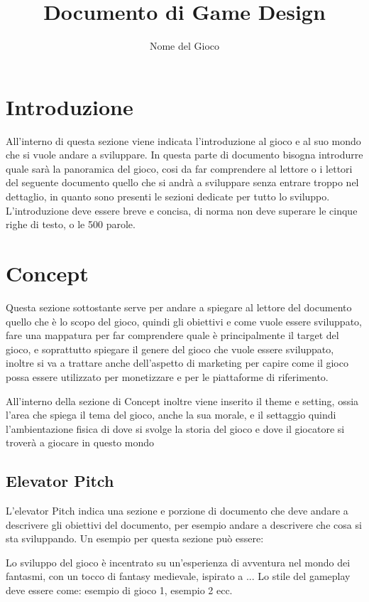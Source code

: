 \documentclass{report}
\title{Documento di Game Design}
\author{Nome del Gioco}
\begin{document}
\maketitle

\tableofcontents
\section{Introduzione}
All'interno di questa sezione viene indicata l'introduzione al gioco e al suo mondo che si vuole andare a sviluppare.
In questa parte di documento bisogna introdurre quale sarà la panoramica del gioco, cosi da far comprendere al lettore o i lettori del seguente documento quello che si andrà a sviluppare senza entrare troppo nel dettaglio, in quanto sono presenti le sezioni dedicate per tutto lo sviluppo.
L'introduzione deve essere breve e concisa, di norma non deve superare le cinque righe di testo, o le 500 parole.

\newpage
\section{Concept}

Questa sezione sottostante serve per andare a spiegare al lettore del documento quello che è lo scopo del gioco, quindi gli obiettivi e come vuole essere sviluppato, fare una mappatura per far comprendere quale è principalmente il target del gioco, e soprattutto spiegare il genere del gioco che vuole essere sviluppato, inoltre si va a trattare anche dell'aspetto di marketing per capire come il gioco possa essere utilizzato per monetizzare e per le piattaforme di riferimento.

All'interno della sezione di Concept inoltre viene inserito il theme e setting, ossia l'area che spiega il tema del gioco, anche la sua morale, e il settaggio quindi l'ambientazione fisica di dove si svolge la storia del gioco e dove il giocatore si troverà a giocare in questo mondo

\subsection{Elevator Pitch}
L'elevator Pitch indica una sezione e porzione di documento che deve andare a descrivere gli obiettivi del documento, per esempio andare a descrivere che cosa si sta sviluppando.
Un esempio per questa sezione può essere: 

Lo sviluppo del gioco è incentrato su un'esperienza di avventura nel mondo dei fantasmi, con un tocco di fantasy medievale, ispirato a ... 
Lo stile del gameplay deve essere come: esempio di gioco 1, esempio 2 ecc.
\end{document}
